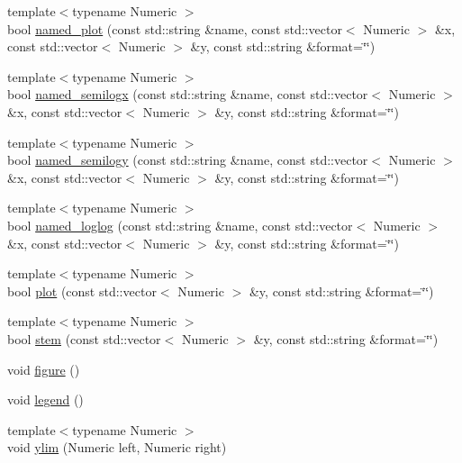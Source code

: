 \begin{DoxyCompactItemize}
\item 
{\footnotesize template$<$typename Numeric $>$ }\\bool \hyperlink{namespacematplotlibcpp_a547854898d3b05c1ed182ad744545f43}{named\+\_\+plot} (const std\+::string \&name, const std\+::vector$<$ Numeric $>$ \&x, const std\+::vector$<$ Numeric $>$ \&y, const std\+::string \&format=\char`\"{}\char`\"{})
\item 
{\footnotesize template$<$typename Numeric $>$ }\\bool \hyperlink{namespacematplotlibcpp_a7696c0134091453723de840be016e43a}{named\+\_\+semilogx} (const std\+::string \&name, const std\+::vector$<$ Numeric $>$ \&x, const std\+::vector$<$ Numeric $>$ \&y, const std\+::string \&format=\char`\"{}\char`\"{})
\item 
{\footnotesize template$<$typename Numeric $>$ }\\bool \hyperlink{namespacematplotlibcpp_a34ff51e2a6f94ea30b4ead714f480c4f}{named\+\_\+semilogy} (const std\+::string \&name, const std\+::vector$<$ Numeric $>$ \&x, const std\+::vector$<$ Numeric $>$ \&y, const std\+::string \&format=\char`\"{}\char`\"{})
\item 
{\footnotesize template$<$typename Numeric $>$ }\\bool \hyperlink{namespacematplotlibcpp_ad7616968e5a639737fd547eb7fa0a8a0}{named\+\_\+loglog} (const std\+::string \&name, const std\+::vector$<$ Numeric $>$ \&x, const std\+::vector$<$ Numeric $>$ \&y, const std\+::string \&format=\char`\"{}\char`\"{})
\item 
{\footnotesize template$<$typename Numeric $>$ }\\bool \hyperlink{namespacematplotlibcpp_a92c59dd37fb3f355514d88e364ddfde9}{plot} (const std\+::vector$<$ Numeric $>$ \&y, const std\+::string \&format=\char`\"{}\char`\"{})
\item 
{\footnotesize template$<$typename Numeric $>$ }\\bool \hyperlink{namespacematplotlibcpp_a40ac4e0d416fad21899637dcf8d281c6}{stem} (const std\+::vector$<$ Numeric $>$ \&y, const std\+::string \&format=\char`\"{}\char`\"{})
\item 
void \hyperlink{namespacematplotlibcpp_ade0e4c19cb3e1c9e4919f67da97bb992}{figure} ()
\item 
void \hyperlink{namespacematplotlibcpp_a916bb5a9dc5f6a24877cc027bf4ee624}{legend} ()
\item 
{\footnotesize template$<$typename Numeric $>$ }\\void \hyperlink{namespacematplotlibcpp_a4645651772918e2dad7d36d9eeaeaefa}{ylim} (Numeric left, Numeric right)

\end{DoxyCompactItemize}
